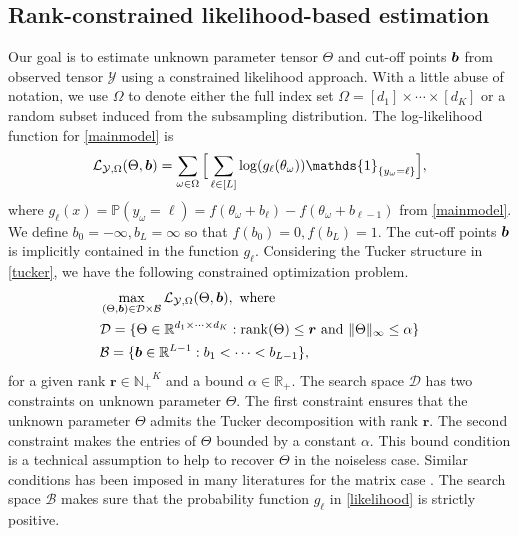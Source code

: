 \documentclass{article}
\theoremstyle{plain}
\theoremstyle{definition}
\begin{document}
\subsection{Rank-constrained likelihood-based estimation}
Our goal is to estimate unknown parameter tensor $\Theta$ and cut-off points $\bm{b}$ from observed tensor $\mathcal{Y}$ using a constrained likelihood approach. With a little abuse of notation, we use $\Omega$ to denote either the full index set $\Omega = [d_1]\times\cdots\times[d_K]$ or a random subset induced from the subsampling distribution. The log-likelihood function for \eqref{mainmodel} is
\begin{equation}
    \label{likelihood}
    \begin{aligned}
    \mathcal{L}_{\mathcal{Y},\Omega}(\Theta,\mb) = \sum_{\omega\in\Omega}\Big[\sum_{\ell\in[L]}\log(g_\ell(\theta_\omega))\mathds{1}_{\{y_\omega = \ell\}}\Big],
    \end{aligned}
\end{equation}
where $g_\ell(x) = \mathbb{P}(y_\omega = \ell) = f(\theta_\omega+b_\ell)-f(\theta_\omega+b_{\ell-1})$ from \eqref{mainmodel}. We define $b_0 = -\infty,b_L = \infty$ so that $f(b_0) = 0, f(b_L) = 1$. The cut-off points $\bm{b}$ is implicitly contained in the function $g_\ell$.
Considering the Tucker structure in \eqref{tucker}, we have the following constrained optimization problem.
\begin{equation}
    \label{eq:optimization}
    \begin{aligned}
        &\max_{(\Theta, \bm{b})\in \mathcal{D}\times\mathcal{B}}\mathcal{L}_{\mathcal{Y},\Omega}(\Theta,\bm{b}),\text{ where }\\
        &\mathcal{D} = \{\Theta\in \mathbb{R}^{d_1\times\cdots\times d_K}: \operatorname*{rank}(\Theta) \leq \bm{r} \text{ and } \lVert\Theta\rVert_\infty\leq \alpha \}\\
        &\mathcal{B} = \{\bm{b}\in\mathbb{R}^{L-1}:  b_1<\cdots < b_{L-1}\},
    \end{aligned}
\end{equation}
for a given rank $\bm r\in \mathbb{N_+}^K$ and a bound $\alpha \in \mathbb{R}_+$. The search space $\mathcal{D}$ has two constraints on unknown parameter $\Theta$. The first constraint ensures that the unknown parameter $\Theta$ admits the Tucker decomposition with rank $\bm r$. The second constraint makes the entries of $\Theta$ bounded by a constant $\alpha$. This bound condition is a technical assumption to help to recover $\Theta$ in the noiseless case. Similar conditions has been imposed in many literatures for the matrix case \citep{davenport20141,bhaskar20151,cai2013max,bhaskar2016probabilistic}.
The search space $\mathcal{B}$ makes sure that the probability function $g_\ell$ in \eqref{likelihood} is strictly positive.
\end{document}
